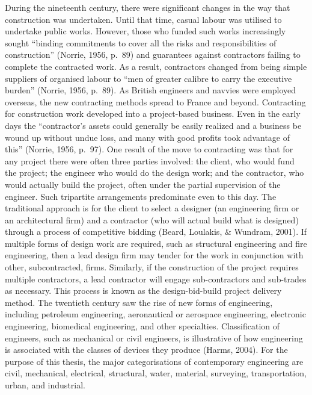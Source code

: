 \documentclass[]{book}
\theoremstyle{definition}
\theoremstyle{definition}
\theoremstyle{definition}
\theoremstyle{remark}
\begin{document}
During the nineteenth century, there were significant changes in the way
that construction was undertaken. Until that time, casual labour was
utilised to undertake public works. However, those who funded such works
increasingly sought ``binding commitments to cover all the risks and
responsibilities of construction'' (Norrie, 1956, p.~89) and guarantees
against contractors failing to complete the contracted work. As a
result, contractors changed from being simple suppliers of organised
labour to ``men of greater calibre to carry the executive burden''
(Norrie, 1956, p.~89). As British engineers and navvies were employed
overseas, the new contracting methods spread to France and beyond.
Contracting for construction work developed into a project-based
business. Even in the early days the ``contractor's assets could
generally be easily realized and a business be wound up without undue
loss, and many with good profits took advantage of this'' (Norrie, 1956,
p.~97). One result of the move to contracting was that for any project
there were often three parties involved: the client, who would fund the
project; the engineer who would do the design work; and the contractor,
who would actually build the project, often under the partial
supervision of the engineer. Such tripartite arrangements predominate
even to this day. The traditional approach is for the client to select a
designer (an engineering firm or an architectural firm) and a contractor
(who will actual build what is designed) through a process of
competitive bidding (Beard, Loulakis, \& Wundram, 2001). If multiple
forms of design work are required, such as structural engineering and
fire engineering, then a lead design firm may tender for the work in
conjunction with other, subcontracted, firms. Similarly, if the
construction of the project requires multiple contractors, a lead
contractor will engage sub-contractors and sub-trades as necessary. This
process is known as the design-bid-build project delivery method. The
twentieth century saw the rise of new forms of engineering, including
petroleum engineering, aeronautical or aerospace engineering, electronic
engineering, biomedical engineering, and other specialties.
Classification of engineers, such as mechanical or civil engineers, is
illustrative of how engineering is associated with the classes of
devices they produce (Harms, 2004). For the purpose of this thesis, the
major categorisations of contemporary engineering are civil, mechanical,
electrical, structural, water, material, surveying, transportation,
urban, and industrial.
\end{document}
